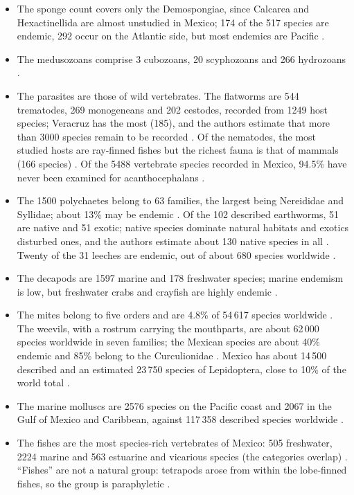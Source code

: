 \begin{itemize}
\item The sponge count covers only the
Demospongiae, since Calcarea and
Hexactinellida are almost unstudied in
Mexico; 174 of the 517 species are endemic,
292 occur on the Atlantic side, but most
endemics are Pacific
\cite{carballo2014porifera}.
\item The medusozoans comprise 3 cubozoans,
20 scyphozoans and 266 hydrozoans
\cite{gasca2014medusozoa}.
\item The parasites are those of wild
vertebrates. The flatworms are 544
trematodes, 269 monogeneans and 202 cestodes,
recorded from 1249 host species; Veracruz has
the most (185), and the authors estimate that
more than 3000 species remain to be recorded
\cite{garciaprieto2014platyhelminthes}. Of
the nematodes, the most studied hosts are
ray-finned fishes but the richest fauna is
that of mammals (166 species)
\cite{garciaprieto2014nematoda}. Of the 5488
vertebrate species recorded in Mexico, 94.5\%
have never been examined for acanthocephalans
\cite{garciaprieto2014acanthocephala}.
\item The 1500 polychaetes belong to 63
families, the largest being Nereididae and
Syllidae; about 13\% may be endemic
\cite{tovarhernandez2014polychaeta}. Of the
102 described earthworms, 51 are native and
51 exotic; native species dominate natural
habitats and exotics disturbed ones, and the
authors estimate about 130 native species in
all \cite{fragoso2014oligochaeta}. Twenty of
the 31 leeches are endemic, out of about 680
species worldwide
\cite{oceguera2014euhirudinea}.
\item The decapods are 1597 marine and 178
freshwater species; marine endemism is low,
but freshwater crabs and crayfish are highly
endemic \cite{alvarez2014decapoda}.
\item The mites belong to five orders and are
4.8\% of 54\,617 species worldwide
\cite{perez2014acari}. The weevils, with a
rostrum carrying the mouthparts, are about
62\,000 species worldwide in seven families;
the Mexican species are about 40\% endemic
and 85\% belong to the Curculionidae
\cite{morrone2014curculionoidea}. Mexico has
about 14\,500 described and an estimated
23\,750 species of Lepidoptera, close to 10\%
of the world total
\cite{llorente2014lepidoptera}.
\item The marine molluscs are 2576 species on
the Pacific coast and 2067 in the Gulf of
Mexico and Caribbean, against 117\,358
described species worldwide
\cite{castillo2014moluscos}.
\item The fishes are the most species-rich
vertebrates of Mexico: 505 freshwater, 2224
marine and 563 estuarine and vicarious
species (the categories overlap)
\cite{espinosa2014peces}. ``Fishes'' are not
a natural group: tetrapods arose from within
the lobe-finned fishes, so the group is
paraphyletic \cite[Chapter
16]{hickman2002animal}.
\end{itemize}


